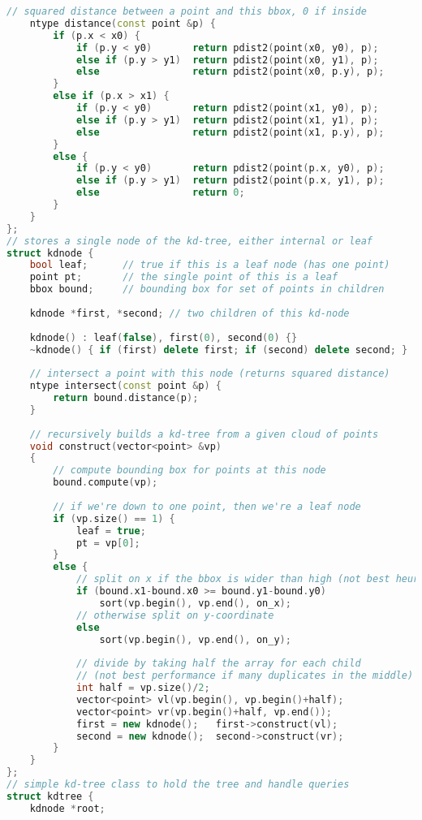 \begin{lstlisting}[language=C++]
    // squared distance between a point and this bbox, 0 if inside
    ntype distance(const point &p) {
        if (p.x < x0) {
            if (p.y < y0)       return pdist2(point(x0, y0), p);
            else if (p.y > y1)  return pdist2(point(x0, y1), p);
            else                return pdist2(point(x0, p.y), p);
        }
        else if (p.x > x1) {
            if (p.y < y0)       return pdist2(point(x1, y0), p);
            else if (p.y > y1)  return pdist2(point(x1, y1), p);
            else                return pdist2(point(x1, p.y), p);
        }
        else {
            if (p.y < y0)       return pdist2(point(p.x, y0), p);
            else if (p.y > y1)  return pdist2(point(p.x, y1), p);
            else                return 0;
        }
    }
};
// stores a single node of the kd-tree, either internal or leaf
struct kdnode {
    bool leaf;      // true if this is a leaf node (has one point)
    point pt;       // the single point of this is a leaf
    bbox bound;     // bounding box for set of points in children
    
    kdnode *first, *second; // two children of this kd-node
    
    kdnode() : leaf(false), first(0), second(0) {}
    ~kdnode() { if (first) delete first; if (second) delete second; }
    
    // intersect a point with this node (returns squared distance)
    ntype intersect(const point &p) {
        return bound.distance(p);
    }
    
    // recursively builds a kd-tree from a given cloud of points
    void construct(vector<point> &vp)
    {
        // compute bounding box for points at this node
        bound.compute(vp);
        
        // if we're down to one point, then we're a leaf node
        if (vp.size() == 1) {
            leaf = true;
            pt = vp[0];
        }
        else {
            // split on x if the bbox is wider than high (not best heuristic...)
            if (bound.x1-bound.x0 >= bound.y1-bound.y0)
                sort(vp.begin(), vp.end(), on_x);
            // otherwise split on y-coordinate
            else
                sort(vp.begin(), vp.end(), on_y);
            
            // divide by taking half the array for each child
            // (not best performance if many duplicates in the middle)
            int half = vp.size()/2;
            vector<point> vl(vp.begin(), vp.begin()+half);
            vector<point> vr(vp.begin()+half, vp.end());
            first = new kdnode();   first->construct(vl);
            second = new kdnode();  second->construct(vr);            
        }
    }
};
// simple kd-tree class to hold the tree and handle queries
struct kdtree {
    kdnode *root;
    

\end{lstlisting}
